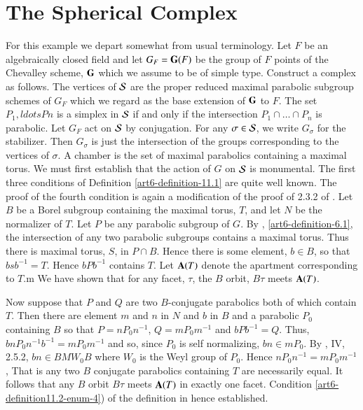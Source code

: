 \section*{The Spherical Complex}
 For this example we depart somewhat from usual  terminology. Let $F$ be an algebraically closed field and let $G_{F} = \mathbf{G}(F)$ be the group of $F$ points of the Chevalley scheme, $\mathbf{G}$ which we assume to be of simple type. Construct a complex as follows. The vertices of $\mathcal{S}$ are the proper reduced maximal parabolic subgroup schemes of $G_{F}$ which we regard as the base extension of $\mathbf{G}$ to $F$. The set $P_{1},ldots P{n}$ is a simplex in $\mathcal{S}$ if and only if the intersection  $P_{1}\cap \ldots \cap P_{n}$ is parabolic. Let $G_{F}$ act on $\mathcal{S}$ by conjugation. For any $\sigma \in \mathcal{S}$, we write $G_{\sigma}$ for the stabilizer. Then $G_{\sigma}$ is just the intersection of the groups corresponding to the vertices of $\sigma$. A chamber is the set of maximal parabolics containing a maximal torus. We must first establish that the action of $G$ on $\mathcal{S}$ is monumental. The first three conditions of Definition
 \ref{art6-definition-11.1} are quite well  known. The proof of the fourth condition is again a modification of the proof of 2.3.2 of \cite{art6-keyBT-I}. Let $B$ be a Borel subgroup containing the maximal torus, $T$, and let $N$ be the normalizer of $T$. Let $P$ be any parabolic subgroup of $G$. By \cite{art6-keyH}, \ref{art6-definition-6.1}, the intersection of any two parabolic subgroups contains a maximal torus. Thus there is maximal torus, $S$, in $P \cap B$. Hence there is some element, $b \in B$, so that $bsb^{-1} = T$. Hence $bPb^{-1}$ contains $T$. Let $\mathbf{A}(T)$ denote the apartment corresponding to $T$.m We have shown that for any facet, $\tau$, the $B$ orbit, $B\tau$  meets $\mathbf{A}(T)$.  

Now suppose that $P$ and $Q$ are two $B$-conjugate parabolics both of which contain $T$. Then there are element $m$ and $n$ in $N$ and $b$ in $B$ and a parabolic $P_{0}$ containing $B$ so that $P=nP_{0}n^{-1}$, $Q=m P_{0}m^{-1}$ and $bPb^{-1}=Q$. Thus, $bnP_{0}n^{-1}b^{-1} = mP_{0}m^{-1}$ and so, since $P_{0}$ is self normalizing, $bn \in m P_{0}$. By \cite{art6-keyBo}, IV, 2.5.2, $bn \in BMW_{0} B$ where $W_{0}$ is the Weyl group of $P_{0}$. Hence $nP_{0}n^{-1} = mP_{0}m^{-1}$, That is any two $B$ conjugate parabolics containing $T$ are necessarily equal. It follows that any $B$ orbit $B\tau$ meets $\mathbf{A}(T)$ in exactly one facet. Condition \ref{art6-definition11.2-enum-4}) of the definition in hence established.

